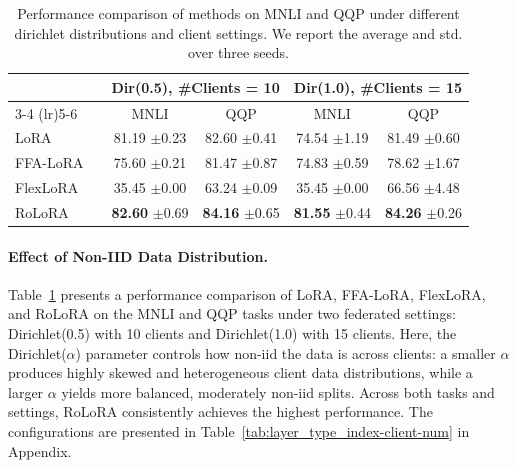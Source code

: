 \documentclass{article}
\newcommand{\com}[1]{\tiny$\pm$#1}
\theoremstyle{plain}
\theoremstyle{definition}
\theoremstyle{remark}
\begin{document}
\begin{table}
{\scriptsize
\centering

\begin{tabular}{ll|cc|cc}
\toprule
\multirow{2}{*}{} & \multirow{2}{*}{} & \multicolumn{2}{c|}{Dir(0.5), \#Clients = 10} & \multicolumn{2}{c}{Dir(1.0), \#Clients = 15} \\
\cmidrule(lr){3-4} \cmidrule(lr){5-6}
 & & {MNLI} & {QQP} & {MNLI} & {QQP} \\
\midrule
{LoRA}     &   & 81.19 \com{0.23}  & 82.60 \com 0.41 & 74.54 \com 1.19 & 81.49 \com 0.60 \\
{FFA-LoRA} &   & 75.60 \com{0.21}  & 81.47 \com 0.87 & 74.83 \com 0.59 & 78.62 \com 1.67 \\
{FlexLoRA} &   & 35.45 \com 0.00   & 63.24 \com 0.09 & 35.45 \com 0.00 &  66.56 \com 4.48 \\
\rowcolor{ours} {RoLoRA}   &   & \textbf{82.60} \com 0.69   & \textbf{ 84.16 }\com 0.65 & \textbf{81.55} \com 0.44 & \textbf{84.26} \com 0.26\\
\bottomrule
\end{tabular}
\vspace{1pt} 
\caption{Performance comparison of methods on MNLI and QQP under different dirichlet distributions and client settings. We report the average and std. over three seeds.}
\label{tab:noniid-llm}}
\end{table}
\vspace{-0.3cm}
\paragraph{Effect of Non-IID Data Distribution.}
Table~\ref{tab:noniid-llm} presents a performance comparison of LoRA, FFA-LoRA, FlexLoRA, and RoLoRA on the MNLI and QQP tasks under two federated settings: Dirichlet(0.5) with 10 clients and Dirichlet(1.0) with 15 clients. Here, the Dirichlet($\alpha$) parameter controls how non-iid the data is across clients: a smaller $\alpha$ produces highly skewed and heterogeneous client data distributions, while a larger $\alpha$ yields more balanced, moderately non-iid splits. Across both tasks and settings, RoLoRA consistently achieves the highest performance. The configurations are presented in Table~\ref{tab:layer_type_index-client-num} in Appendix.
\end{document}
